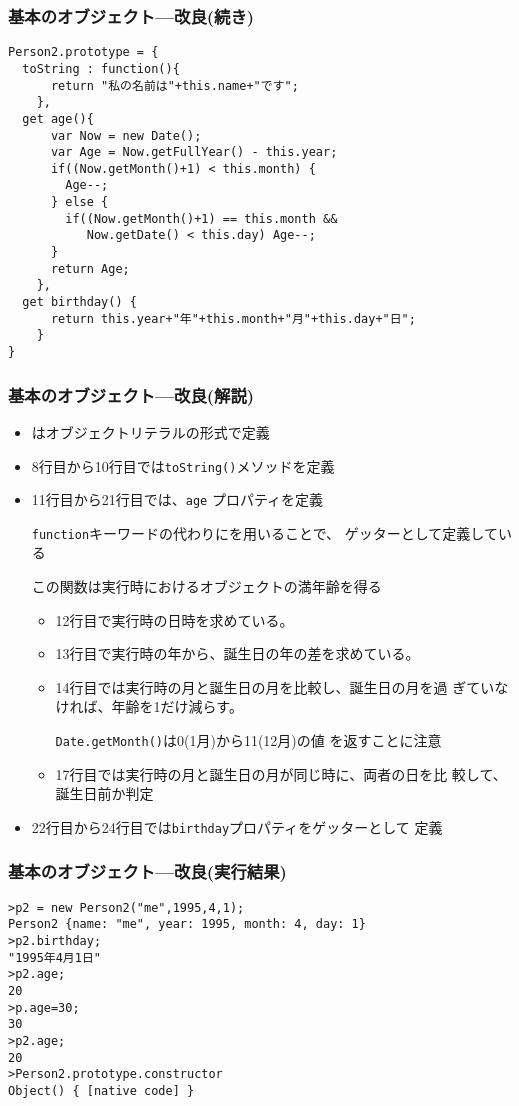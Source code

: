 \begin{frame}[containsverbatim]
 \frametitle{基本のオブジェクト---改良(続き)}
 {\small
\begin{Verbatim}
Person2.prototype = {
  toString : function(){
      return "私の名前は"+this.name+"です";
    },
  get age(){
      var Now = new Date();
      var Age = Now.getFullYear() - this.year;
      if((Now.getMonth()+1) < this.month) {
        Age--;
      } else {
        if((Now.getMonth()+1) == this.month &&
           Now.getDate() < this.day) Age--;
      }
      return Age;
    },
  get birthday() {
      return this.year+"年"+this.month+"月"+this.day+"日";
    }
}
\end{Verbatim}
 }
 \end{frame}
\begin{frame}[containsverbatim]
 \frametitle{基本のオブジェクト---改良(解説)}
 \begin{itemize}
  \item {}はオブジェクトリテラルの形式で定義
  \item 8行目から10行目では\texttt{toString()}メソッドを定義
  \item 11行目から21行目では、\texttt{age} プロパティを定義
        
        \texttt{function}キーワードの代わりにを用いることで、
        ゲッターとして定義している

        この関数は実行時におけるオブジェクトの満年齢を得る
        \begin{itemize}
         \item 12行目で実行時の日時を求めている。
         \item 13行目で実行時の年から、誕生日の年の差を求めている。
         \item 14行目では実行時の月と誕生日の月を比較し、誕生日の月を過
               ぎていなければ、年齢を1だけ減らす。

               \texttt{Date.getMonth()}は0(1月)から11(12月)の値
               を返すことに注意
         \item 17行目では実行時の月と誕生日の月が同じ時に、両者の日を比
               較して、誕生日前か判定
        \end{itemize}
  \item 22行目から24行目では\texttt{birthday}プロパティをゲッターとして
        定義
 \end{itemize}
\end{frame}
\begin{frame}[containsverbatim]
 \frametitle{基本のオブジェクト---改良(実行結果)}
\begin{Verbatim}
>p2 = new Person2("me",1995,4,1);
Person2 {name: "me", year: 1995, month: 4, day: 1}
>p2.birthday;
"1995年4月1日"
>p2.age;
20
>p.age=30;
30
>p2.age;
20
>Person2.prototype.constructor
Object() { [native code] }
\end{Verbatim}
 \end{frame}
